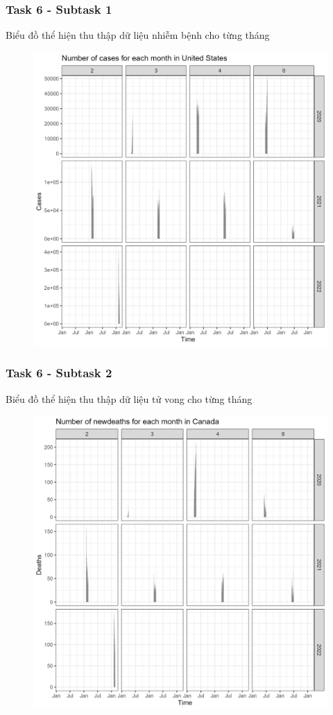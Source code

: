 \documentclass[english,10pt,table]{beamer}
\begin{document}
\frame
{
    \frametitle{Task 6 - Subtask 1}
    \begin{block}{Biểu đồ thể hiện thu thập dữ liệu nhiễm bệnh cho từng tháng}
    \begin{figure}[H]
		\centering
		\includegraphics[scale=0.11]{images/6.1.3.png}
	\end{figure}
    \end{block}
}
\frame
{
    \frametitle{Task 6 - Subtask 2}
    \begin{block}{Biểu đồ thể hiện thu thập dữ liệu tử vong cho từng tháng}
    \begin{figure}[H]
		\centering
		\includegraphics[scale=0.11]{images/6.2.1.png}
	\end{figure}
    \end{block}
}
\end{document}
